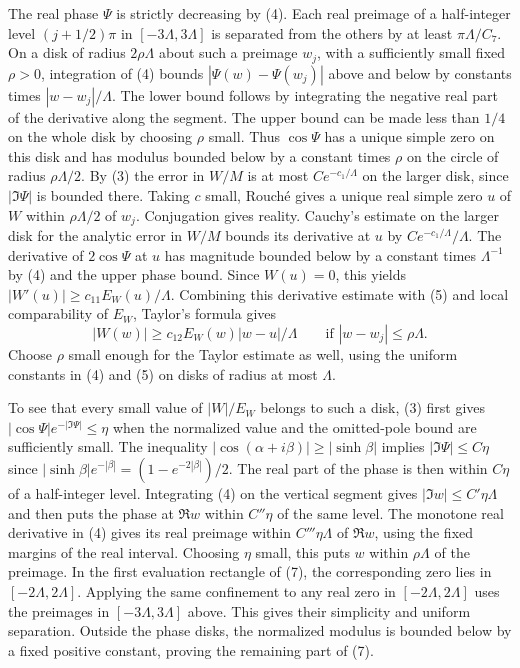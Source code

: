 \documentclass[11pt]{article}
\begin{document}
The real phase $\Psi$ is strictly decreasing by (4). Each real preimage of a half-integer level $(j+1/2)\pi$ in $[-3\Lambda,3\Lambda]$ is separated from the others by at least $\pi\Lambda/C_7$. On a disk of radius $2\rho\Lambda$ about such a preimage $w_j$, with a sufficiently small fixed $\rho>0$, integration of (4) bounds $|\Psi(w)-\Psi(w_j)|$ above and below by constants times $|w-w_j|/\Lambda$. The lower bound follows by integrating the negative real part of the derivative along the segment. The upper bound can be made less than $1/4$ on the whole disk by choosing $\rho$ small. Thus $\cos\Psi$ has a unique simple zero on this disk and has modulus bounded below by a constant times $\rho$ on the circle of radius $\rho\Lambda/2$. By (3) the error in $W/M$ is at most $C e^{-c_1/\Lambda}$ on the larger disk, since $|\Im\Psi|$ is bounded there. Taking $c$ small, Rouché gives a unique real simple zero $u$ of $W$ within $\rho\Lambda/2$ of $w_j$. Conjugation gives reality. Cauchy's estimate on the larger disk for the analytic error in $W/M$ bounds its derivative at $u$ by $C e^{-c_1/\Lambda}/\Lambda$. The derivative of $2\cos\Psi$ at $u$ has magnitude bounded below by a constant times $\Lambda^{-1}$ by (4) and the upper phase bound. Since $W(u)=0$, this yields $|W'(u)|\ge c_{11}E_W(u)/\Lambda$. Combining this derivative estimate with (5) and local comparability of $E_W$, Taylor's formula gives
\[
 |W(w)|\ge c_{12}E_W(w)|w-u|/\Lambda
 \qquad\text{if } |w-w_j|\le\rho\Lambda .
\]
Choose $\rho$ small enough for the Taylor estimate as well, using the uniform constants in (4) and (5) on disks of radius at most $\Lambda$.

To see that every small value of $|W|/E_W$ belongs to such a disk, (3) first gives $|\cos\Psi|e^{-|\Im\Psi|}\le \eta$ when the normalized value and the omitted-pole bound are sufficiently small. The inequality $|\cos(\alpha+i\beta)|\ge|\sinh\beta|$ implies $|\Im\Psi|\le C\eta$ since $|\sinh\beta|e^{-|\beta|}=(1-e^{-2|\beta|})/2$. The real part of the phase is then within $C\eta$ of a half-integer level. Integrating (4) on the vertical segment gives $|\Im w|\le C'\eta\Lambda$ and then puts the phase at $\Re w$ within $C''\eta$ of the same level. The monotone real derivative in (4) gives its real preimage within $C'''\eta\Lambda$ of $\Re w$, using the fixed margins of the real interval. Choosing $\eta$ small, this puts $w$ within $\rho\Lambda$ of the preimage. In the first evaluation rectangle of (7), the corresponding zero lies in $[-2\Lambda,2\Lambda]$. Applying the same confinement to any real zero in $[-2\Lambda,2\Lambda]$ uses the preimages in $[-3\Lambda,3\Lambda]$ above. This gives their simplicity and uniform separation. Outside the phase disks, the normalized modulus is bounded below by a fixed positive constant, proving the remaining part of (7).
\end{document}
